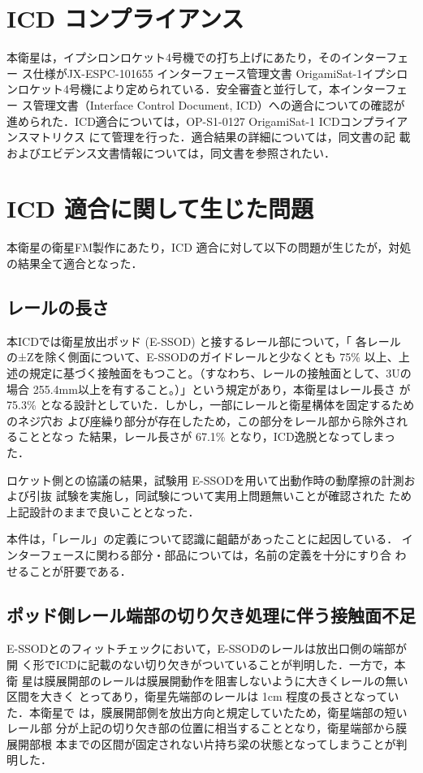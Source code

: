 \section{ICD コンプライアンス}

本衛星は，イプシロンロケット4号機での打ち上げにあたり，そのインターフェー
ス仕様がJX-ESPC-101655 インターフェース管理文書 OrigamiSat-1\/イプシロ
ンロケット4号機により定められている．安全審査と並行して，本インターフェー
ス管理文書（Interface Control Document, ICD）への適合についての確認が
進められた．ICD適合については，OP-S1-0127 OrigamiSat-1 ICDコンプライア
ンスマトリクス にて管理を行った．適合結果の詳細については，同文書の記
載およびエビデンス文書情報については，同文書を参照されたい．

\section{ICD 適合に関して生じた問題}

本衛星の衛星FM製作にあたり，ICD 適合に対して以下の問題が生じたが，対処
の結果全て適合となった．

\subsection{レールの長さ}
本ICDでは衛星放出ポッド (E-SSOD) と接するレール部について，「 各レール
  の±Zを除く側面について、E-SSODのガイドレールと少なくとも 75\% 以上、上
  述の規定に基づく接触面をもつこと。（すなわち、レールの接触面として、3Uの場合
    255.4mm以上を有すること。）」という規定があり，本衛星はレール長さ
が 75.3\% となる設計としていた．しかし，一部にレールと衛星構体を固定するためのネジ穴お
よび座繰り部分が存在したため，この部分をレール部から除外されることとなっ
た結果，レール長さが 67.1\% となり，ICD逸脱となってしまった．

ロケット側との協議の結果，試験用 E-SSODを用いて出動作時の動摩擦の計測および引抜
試験を実施し，同試験について実用上問題無いことが確認された
ため上記設計のままで良いこととなった．

本件は，「レール」の定義について認識に齟齬があったことに起因している．
インターフェースに関わる部分・部品については，名前の定義を十分にすり合
わせることが肝要である．

\subsection{ポッド側レール端部の切り欠き処理に伴う接触面不足}
E-SSODとのフィットチェックにおいて，E-SSODのレールは放出口側の端部が開
く形でICDに記載のない切り欠きがついていることが判明した．一方で，本衛
星は膜展開部のレールは膜展開動作を阻害しないように大きくレールの無い区間を大きく
とってあり，衛星先端部のレールは 1cm 程度の長さとなっていた．本衛星で
は，膜展開部側を放出方向と規定していたため，衛星端部の短いレール部
分が上記の切り欠き部の位置に相当することとなり，衛星端部から膜展開部根
本までの区間が固定されない片持ち梁の状態となってしまうことが判明した．

